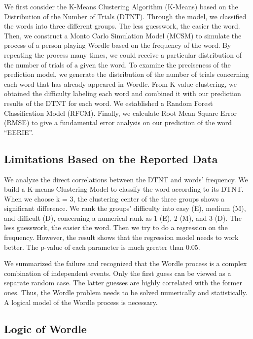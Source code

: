 \documentclass[12pt]{article}
\begin{document}
\vspace{0.3cm}
\noindent
We first consider the K-Means Clustering Algorithm (K-Means) based on the Distribution of the Number of Trials (DTNT). Through the model, we classified the words into three different groups. The less guesswork, the easier the word. Then, we construct a Monto Carlo Simulation Model (MCSM) to simulate the process of a person playing Wordle based on the frequency of the word. By repeating the process many times, we could receive a particular distribution of the number of trials of a given the word. To examine the preciseness of the prediction model, we generate the distribution of the number of trials concerning each word that has already appeared in Wordle. From K-value clustering, we obtained the difficulty labeling each word and combined it with our prediction results of the DTNT for each word. We established a Random Forest Classification Model (RFCM). Finally, we calculate Root Mean Square Error (RMSE) to give a fundamental error analysis on our prediction of the word “EERIE”.

\subsection{Limitations Based on the Reported Data}
We analyze the direct correlations between the DTNT and words' frequency. We build a K-means Clustering Model to classify the word according to its DTNT. When we choose k = 3, the clustering center of the three groups shows a significant difference. We rank the groups’ difficulty into easy (E), medium (M), and difficult (D), concerning a numerical rank as 1 (E), 2 (M), and 3 (D). The less guesswork, the easier the word. Then we try to do a regression on the frequency. However, the result shows that the regression model needs to work better. The p-value of each parameter is much greater than 0.05.

\vspace{0.3cm}
\noindent
We summarized the failure and recognized that the Wordle process is a complex combination of independent events. Only the first guess can be viewed as a separate random case. The latter guesses are highly correlated with the former ones. Thus, the Wordle problem needs to be solved numerically and statistically. A logical model of the Wordle process is necessary.

\subsection{Logic of Wordle}
\end{document}
